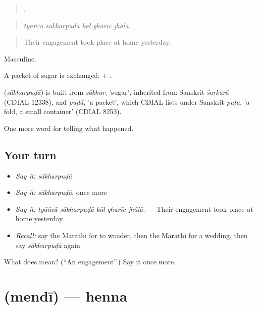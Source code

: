 \begin{quote}
    .
\end{quote}

\begin{quote}
\emph{tyāñcā sākharpuḍā kāl gharīc jhālā.}
\end{quote}

\begin{quote}
Their engagement took place at home yesterday.
\end{quote}

Masculine.

A packet of sugar is exchanged:  + .

\begin{cousinweb}
\textbf{} (\emph{sākharpuḍā}) is built from \emph{sākhar}, 'sugar', inherited from Sanskrit \emph{śarkarā} (CDIAL 12338), and \emph{puḍā}, 'a packet', which CDIAL lists under Sanskrit \emph{puṭa}, 'a fold, a small container' (CDIAL 8253).
\end{cousinweb}

\begin{grammarlens}[title={What you've built}]
One more word for telling what happened.
\end{grammarlens}

\subsection*{Your turn}
\begin{itemize}
\raggedright
  \item \emph{Say it:} \emph{sākharpuḍā}
  \item \emph{Say it:} \emph{sākharpuḍā}, once more
  \item \emph{Say it:} \emph{tyāñcā sākharpuḍā kāl gharīc jhālā.} — Their engagement took place at home yesterday.
  \item \emph{Recall:} say the Marathi for to wander, then the Marathi for a wedding, then say \emph{sākharpuḍā} again
\end{itemize}

\begin{tcolorbox}[breakable,colback=teal!4,colframe=teal!35!black,title={Before you move on}]
What does  mean? (\textquotedblleft{}An engagement\textquotedblright{}.) Say it once more.
\end{tcolorbox}
\section[\texorpdfstring{\mr{मेंदी} (mendī)}{मेंदी (mendī)}]{ (mendī) — henna}

